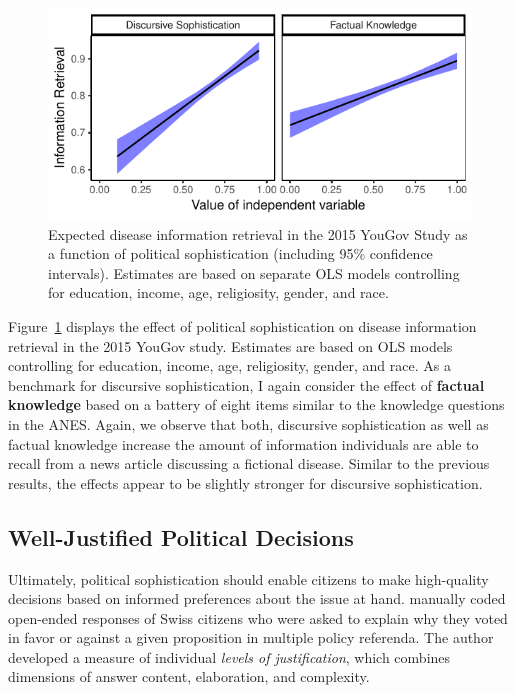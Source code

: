 \documentclass[12pt]{article}
\begin{document}
\begin{figure}[h]\centering
\includegraphics{../fig/yg_disease.pdf}
\caption{Expected disease information retrieval in the 2015 YouGov Study as a function of political sophistication (including 95\% confidence intervals). Estimates are based on separate OLS models controlling for education, income, age, religiosity, gender, and race.}\label{fig:yg_corplot}
\end{figure}

Figure~\ref{fig:yg_corplot} displays the effect of political sophistication on disease information retrieval in the 2015 YouGov study. Estimates are based on OLS models controlling for education, income, age, religiosity, gender, and race. As a benchmark for discursive sophistication, I again consider the effect of \textbf{factual knowledge} based on a battery of eight items similar to the knowledge questions in the ANES. Again, we observe that both, discursive sophistication as well as factual knowledge increase the amount of information individuals are able to recall from a news article discussing a fictional disease. Similar to the previous results, the effects appear to be slightly stronger for discursive sophistication.


\subsection*{Well-Justified Political Decisions}

Ultimately, political sophistication should enable citizens to make high-quality decisions based on informed preferences about the issue at hand. \citet{colombo2016justifications} manually coded open-ended responses of Swiss citizens who were asked to explain why they voted in favor or against a given proposition in multiple policy referenda. The author developed a measure of individual \textit{levels of justification}, which combines dimensions of answer content, elaboration, and complexity.
\end{document}
